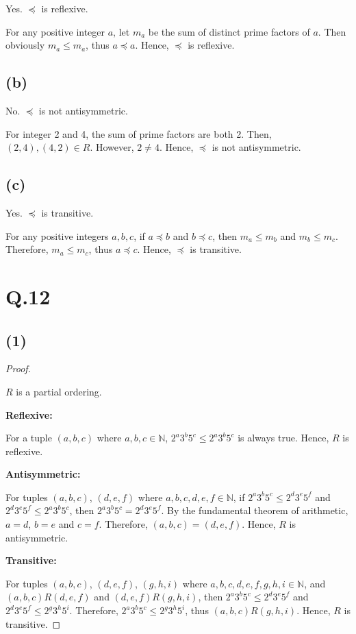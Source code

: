 \documentclass[a4paper,12pt]{article}
\begin{document}
Yes.
$\preceq$ is reflexive.

For any positive integer $a$, let $m_a$ be the sum of distinct prime factors of $a$.
Then obviously $m_a \leq m_a$, thus $a \preceq a$.
Hence, $\preceq$ is reflexive.

\subsection*{(b)}

No.
$\preceq$ is not antisymmetric.

For integer 2 and 4, the sum of prime factors are both 2.
Then, $(2,4), (4,2) \in R$.
However, $2 \neq 4$.
Hence, $\preceq$ is not antisymmetric.

\subsection*{(c)}

Yes.
$\preceq$ is transitive.

For any positive integers $a, b, c$, if $a \preceq b$ and $b \preceq c$, then $m_a \leq m_b$ and $m_b \leq m_c$.
Therefore, $m_a \leq m_c$, thus $a \preceq c$.
Hence, $\preceq$ is transitive.

\section*{Q.12}

\subsection*{(1)}

\begin{proof}
$ $

$R$ is a partial ordering.

\textbf{Reflexive:}

For a tuple $(a,b,c)$ where $a, b, c \in \mathbb{N}$, $2^a3^b5^c \leq 2^a3^b5^c$ is always true.
Hence, $R$ is reflexive.

\textbf{Antisymmetric:}

For tuples $(a,b,c)$, $(d,e,f)$ where $a, b, c, d, e, f \in \mathbb{N}$, if $2^a3^b5^c \leq 2^d3^e5^f$ and $2^d3^e5^f \leq 2^a3^b5^c$, then $2^a3^b5^c = 2^d3^e5^f$.
By the fundamental theorem of arithmetic, $a = d$, $b = e$ and $c = f$.
Therefore, $(a,b,c) = (d,e,f)$.
Hence, $R$ is antisymmetric.

\textbf{Transitive:}

For tuples $(a,b,c)$, $(d,e,f)$, $(g,h,i)$ where $a, b, c, d, e, f, g, h, i \in \mathbb{N}$, and $(a,b,c) R (d,e,f)$ and $(d,e,f) R (g,h,i)$, then $2^a3^b5^c \leq 2^d3^e5^f$ and $2^d3^e5^f \leq 2^g3^h5^i$.
Therefore, $2^a3^b5^c \leq 2^g3^h5^i$, thus $(a,b,c) R (g,h,i)$.
Hence, $R$ is transitive.
\end{proof}
\end{document}
